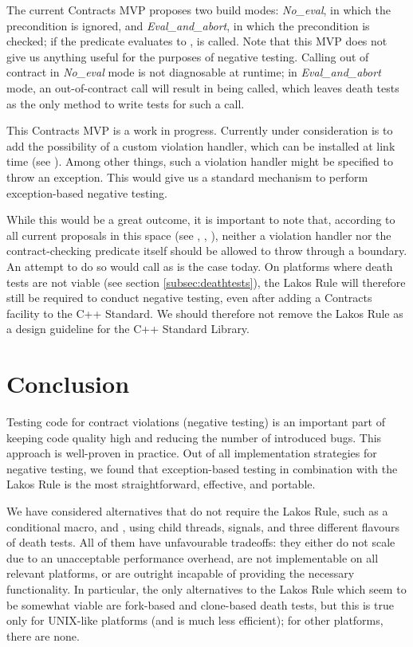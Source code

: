 The current Contracts MVP proposes two build modes: \emph{No_eval}, in which the precondition is ignored, and \emph{Eval_and_abort}, in which the precondition is checked; if the predicate evaluates to ,  is called. Note that this MVP does not give us anything useful for the purposes of negative testing. Calling  out of contract in \emph{No_eval} mode is not diagnosable at runtime; in \mbox{\emph{Eval_and_abort}} mode, an out-of-contract call will result in  being called, which leaves death tests as the only method to write tests for such a call.

This Contracts MVP is a work in progress. Currently under consideration is to add the possibility of a custom violation handler, which can be installed at link time (see \cite{P2811R3}). Among other things, such a violation handler might be specified to throw an exception. This would give us a standard mechanism to perform exception-based negative testing.

While this would be a great outcome, it is important to note that, according to all current proposals in this space (see \cite{P2698R0}, \cite{P2811R3}, \cite{P2834R0}), neither a violation handler nor the contract-checking predicate itself should be allowed to throw through a  boundary. An attempt to do so would call  as is the case today. On platforms where death tests are not viable (see section \ref{subsec:deathtests}), the Lakos Rule will therefore still be required to conduct negative testing, even after adding a Contracts facility to the C++ Standard. We should therefore not remove the Lakos Rule as a design guideline for the C++ Standard Library.

\section{Conclusion}

Testing code for contract violations (negative testing) is an important part of keeping code quality high and reducing the number of introduced bugs. This approach is well-proven in practice. Out of all implementation strategies for negative testing, we found that exception-based testing in combination with the Lakos Rule is the most straightforward, effective, and portable.

We have considered alternatives that do not require the Lakos Rule, such as a conditional  macro,  and , using child threads, signals, and three different flavours of death tests. All of them have unfavourable tradeoffs: they either do not scale due to an unacceptable performance overhead, are not implementable on all relevant platforms, or are outright incapable of providing the necessary functionality. In particular, the only alternatives to the Lakos Rule which seem to be somewhat viable are fork-based and clone-based death tests, but this is true only for UNIX-like platforms (and is much less efficient); for other platforms, there are none.

